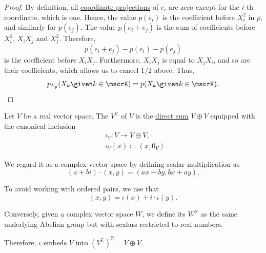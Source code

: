 \begin{proof}
  By definition, all \hyperref[def:basis_decomposition]{coordinate projections} of \( e_i \) are zero except for the \( i \)-th coordinate, which is one. Hence, the value \( p(e_i) \) is the coefficient before \( X_i^2 \) in \( p \), and similarly for \( p(e_j) \). The value \( p(e_i + e_j) \) is the sum of coefficients before \( X_i^2 \), \( X_i X_j \) and \( X_j^2 \). Therefore,
  \begin{equation*}
    p(e_i + e_j) - p(e_i) - p(e_j)
  \end{equation*}
  is the coefficient before \( X_i X_j \). Furthermore, \( X_i X_j \) is equal to \( X_j X_i \), and so are their coefficients, which allows us to cancel \( 1 / 2 \) above. Thus,
  \begin{equation*}
    p_{L_p}(X_k \given k \in \mscrK) = p(X_k \given k \in \mscrK).
  \end{equation*}
\end{proof}

\begin{definition}\label{def:complexification}
  Let \( V \) be a real vector space. The  \( V^\BbbC \) of \( V \) is the \hyperref[def:external_semimodule_direct_sum]{direct sum} \( V \oplus V \) equipped with the canonical inclusion
  \begin{equation*}
    \begin{aligned}
      &\iota_V: V \to V \oplus V, \\
      &\iota_V(x) \coloneqq (x, 0_V).
    \end{aligned}
  \end{equation*}

  We regard it as a complex vector space by defining scalar multiplication as
  \begin{equation*}
    (a + bi) \cdot (x, y) = (ax - by, bx + ay).
  \end{equation*}

  To avoid working with ordered pairs, we use that
  \begin{equation*}
    (x, y) = \iota(x) + i \cdot \iota(y).
  \end{equation*}

  Conversely, given a complex vector space \( W \), we define its  \( W^\BbbR \) as the same underlying Abelian group but with scalars restricted to real numbers.

  Therefore, \( \iota \) embeds \( V \) into \( (V^\BbbC)^\BbbR = V \oplus V \).
\end{definition}

